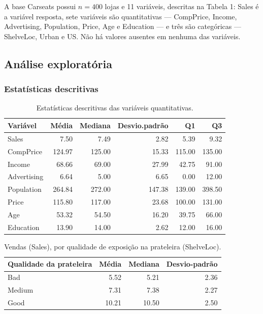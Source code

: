 \documentclass[a4paper]{modeloUFCG} %
\begin{document}
A base Carseats possui \(n = 400\) lojas e 11 variáveis, descritas na Tabela 1: Sales é a variável resposta, sete variáveis são quantitativas --- CompPrice, Income, Advertising, Population, Price, Age e Education --- e três são categóricas --- ShelveLoc, Urban e US. Não há valores ausentes em nenhuma das variáveis.

\subsection{Análise exploratória}\label{anuxe1lise-exploratuxf3ria}

\subsubsection{Estatísticas descritivas}\label{estatuxedsticas-descritivas}

\begin{table}

\caption{\label{tab:descritivas}Estatísticas descritivas das variáveis quantitativas.}
\centering
\begin{tabular}[t]{l|r|r|r|r|r}
\hline
Variável & Média & Mediana & Desvio.padrão & Q1 & Q3\\
\hline
Sales & 7.50 & 7.49 & 2.82 & 5.39 & 9.32\\
\hline
CompPrice & 124.97 & 125.00 & 15.33 & 115.00 & 135.00\\
\hline
Income & 68.66 & 69.00 & 27.99 & 42.75 & 91.00\\
\hline
Advertising & 6.64 & 5.00 & 6.65 & 0.00 & 12.00\\
\hline
Population & 264.84 & 272.00 & 147.38 & 139.00 & 398.50\\
\hline
Price & 115.80 & 117.00 & 23.68 & 100.00 & 131.00\\
\hline
Age & 53.32 & 54.50 & 16.20 & 39.75 & 66.00\\
\hline
Education & 13.90 & 14.00 & 2.62 & 12.00 & 16.00\\
\hline
\end{tabular}
\end{table}

\begin{table}

\caption{\label{tab:descritivasShelveLoc}Vendas (Sales), por qualidade de exposição na prateleira (ShelveLoc).}
\centering
\begin{tabular}[t]{l|r|r|r}
\hline
Qualidade da prateleira & Média & Mediana & Desvio-padrão\\
\hline
Bad & 5.52 & 5.21 & 2.36\\
\hline
Medium & 7.31 & 7.38 & 2.27\\
\hline
Good & 10.21 & 10.50 & 2.50\\
\hline
\end{tabular}
\end{table}
\end{document}
